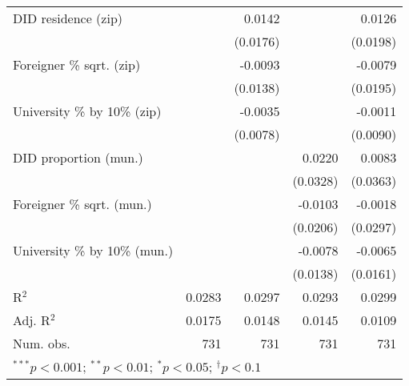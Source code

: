 \begin{tabular}{l D{.}{.}{3.11} D{.}{.}{3.11} D{.}{.}{3.11} D{.}{.}{3.11}}
DID residence (zip)               &                  & 0.0142           &                  & 0.0126           \\
                                  &                  & (0.0176)         &                  & (0.0198)         \\
Foreigner \% sqrt. (zip)          &                  & -0.0093          &                  & -0.0079          \\
                                  &                  & (0.0138)         &                  & (0.0195)         \\
University \% by 10\% (zip)       &                  & -0.0035          &                  & -0.0011          \\
                                  &                  & (0.0078)         &                  & (0.0090)         \\
DID proportion (mun.)             &                  &                  & 0.0220           & 0.0083           \\
                                  &                  &                  & (0.0328)         & (0.0363)         \\
Foreigner \% sqrt. (mun.)         &                  &                  & -0.0103          & -0.0018          \\
                                  &                  &                  & (0.0206)         & (0.0297)         \\
University \% by 10\% (mun.)      &                  &                  & -0.0078          & -0.0065          \\
                                  &                  &                  & (0.0138)         & (0.0161)         \\
\midrule
R$^2$                             & 0.0283           & 0.0297           & 0.0293           & 0.0299           \\
Adj. R$^2$                        & 0.0175           & 0.0148           & 0.0145           & 0.0109           \\
Num. obs.                         & 731              & 731              & 731              & 731              \\
\bottomrule
{}
\end{tabular}
